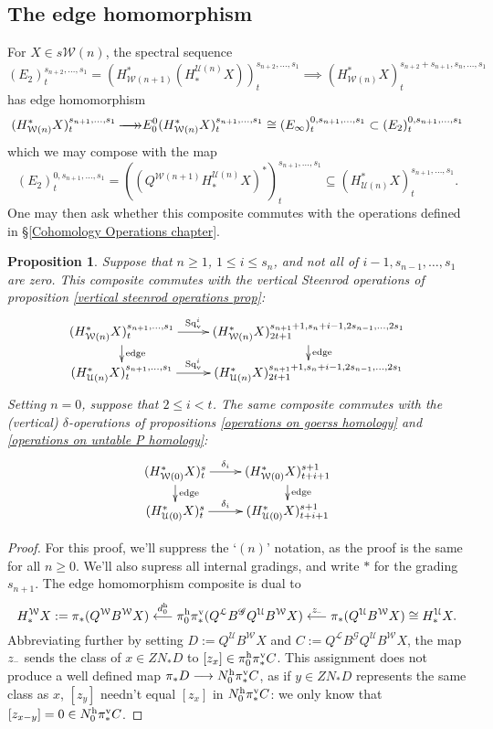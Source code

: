 \documentclass[11pt]{amsart}
\theoremstyle{plain}
\newtheorem{prop}[thm]{Proposition}
\theoremstyle{definition}
\newcommand{\DASH}{\textup{--}}
\renewcommand{\to}{\longrightarrow}
\newcommand{\from}{\longleftarrow}
\newcommand{\scrQ}{\mathscr{Q}}
\newcommand{\scrR}{\mathscr{R}}
\newcommand{\scrT}{\mathscr{T}}
\newcommand{\scrY}{\mathscr{Y}}
\newcommand{\scrI}{\mathscr{I}}
\newcommand{\scrO}{\mathscr{O}}
\newcommand{\scrP}{\mathscr{P}}
\newcommand{\scrS}{\mathscr{S}}
\newcommand{\scrG}{\mathscr{G}}
\newcommand{\scrH}{\mathscr{H}}
\newcommand{\scrJ}{\mathscr{J}}
\newcommand{\scrK}{\mathscr{K}}
\newcommand{\scrL}{\mathscr{L}}
\newcommand{\scrZ}{\mathscr{Z}}
\newcommand{\scrN}{\mathscr{N}}
\newcommand{\scrM}{\mathscr{M}}
\newcommand{\calW}{\mathcal{W}}
\newcommand{\calU}{\mathcal{U}}
\newcommand{\calL}{\mathcal{L}}
\theoremstyle{plain}
\newcommand{\BSW}{{\scrG}}%
\newcommand{\epi}{{\,\makebox[0cm][l]{\ensuremath\to}\to}}
\newcommand{\Sq}{\mathrm{Sq}}
\begin{document}
\begin{Composite functor spectral sequences}
\subsection{The edge homomorphism}
For $X\in s\calW(n)$, the spectral sequence
\[(E_2)^{s_{n+2},\ldots,s_1}_t=(H^*_{\calW(n+1)}(H_*^{\calU(n)}X))^{s_{n+2},\ldots,s_1}_t\implies (H^*_{\calW(n)}X)^{s_{n+2}+s_{n+1},s_n,\ldots,s_1}_t\]
has edge homomorphism
\[(H^*_{\calW(n)}X)^{s_{n+1},\ldots,s_{1}}_t\epi
E_0^{0}(H^*_{\calW(n)}X)^{s_{n+1},\ldots,s_{1}}_t\cong (E_\infty)^{0,s_{n+1},\ldots,s_1}_t\subset (E_2)^{0,s_{n+1},\ldots,s_1}_t\]
which we may compose with the map
\[(E_2)^{0,s_{n+1},\ldots,s_1}_t=((Q^{\calW(n+1)}H_*^{\calU(n)}X)^*)^{s_{n+1},\ldots,s_1}_t\subseteq (H^*_{\calU(n)}X)^{s_{n+1},\ldots,s_1}_t.\]
One may then ask whether this composite commutes with the operations defined in \S\ref{Cohomology Operations chapter}.
\begin{prop}
Suppose that $n\geq1$, $1\leq i \leq s_n$, and not all of $i-1,s_{n-1},\ldots,s_1$ are zero. This composite commutes with the vertical Steenrod operations of proposition \ref{vertical steenrod operations prop}:
\[\xymatrix@R=4mm{
(H^*_{\calW(n)}X)^{s_{n+1},\ldots,s_1}_t\ar[r]^-{\Sq_\textup{v}^i}
\ar[d]^-{\textup{edge}}
&%
(H^*_{\calW(n)}X)^{s_{n+1}+1,s_n+i-1,2s_{n-1},\ldots,2s_1}_{2t+1}\ar[d]^-{\textup{edge}}
\\%
(H^*_{\calU(n)}X)^{s_{n+1},\ldots,s_1}_t\ar[r]^-{\Sq_\textup{v}^i}
&%
(H^*_{\calU(n)}X)^{s_{n+1}+1,s_n+i-1,2s_{n-1},\ldots,2s_1}_{2t+1}
}\]
Setting $n=0$, suppose that $2\leq i <t$. The same composite commutes with the (vertical) $\delta$-operations of propositions \ref{operations on goerss homology} and \ref{operations on untable P homology}:
\[\xymatrix@R=4mm{
(H^*_{\calW(0)}X)^{s}_t\ar[r]^-{\delta_i}
\ar[d]^-{\textup{edge}}
&%
(H^*_{\calW(0)}X)^{s+1}_{t+i+1}\ar[d]^-{\textup{edge}}
\\%
(H^*_{\calU(0)}X)^{s}_t\ar[r]^-{\delta_i}
&%
(H^*_{\calU(0)}X)^{s+1}_{t+i+1}
}\]
\end{prop}
\begin{proof}For this proof, we'll suppress the `$(n)$' notation, as the proof is the same for all $n\geq0$. We'll also supress all internal gradings, and write $*$ for the grading $s_{n+1}$. The edge homomorphism composite is dual to
\[H_*^{\calW}X:=\pi_*(Q^{\calW}B^{\calW}X)\overset{d_0^\textup{h}}{\from}\pi_0^\textup{h}\pi_*^\textup{v}(Q^{\calL}B^{\BSW} Q^{\calU}B^{\calW}X)\overset{z_{\DASH}}{\from}\pi_*(Q^{\calU}B^{\calW}X)\cong H_*^{\calU}X.\]
Abbreviating further by setting $D:=Q^{\calU}B^{\calW}X$ and $C:=Q^{\calL}B^{\BSW} Q^{\calU}B^{\calW}X$, the map $z_{\DASH}$ sends the class of $x\in ZN_*D$ to $[z_x]\in \pi_0^\textup{h}\pi^\textup{v}_*C$. This assignment does not produce a well defined map $\pi_*D\to N^\textup{h}_0\pi^\textup{v}_*C$, as if $y\in ZN_* D$ represents the same class as $x$, $[z_y]$ needn't equal $[z_x]$ in $N^\textup{h}_0\pi^\textup{v}_*C$: we only know that $[z_{x-y}]=0\in N_0^\textup{h}\pi_*^\textup{v}C$.

\end{proof}
\end{Composite functor spectral sequences}
\end{document}
